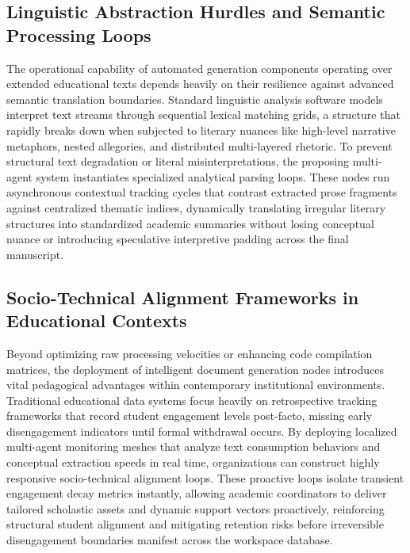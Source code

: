 \subsection{Linguistic Abstraction Hurdles and Semantic Processing Loops}
The operational capability of automated generation components operating over extended educational texts depends heavily on their resilience against advanced semantic translation boundaries. Standard linguistic analysis software models interpret text streams through sequential lexical matching grids, a structure that rapidly breaks down when subjected to literary nuances like high-level narrative metaphors, nested allegories, and distributed multi-layered rhetoric. To prevent structural text degradation or literal misinterpretations, the proposing multi-agent system instantiates specialized analytical parsing loops. These nodes run asynchronous contextual tracking cycles that contrast extracted prose fragments against centralized thematic indices, dynamically translating irregular literary structures into standardized academic summaries without losing conceptual nuance or introducing speculative interpretive padding across the final manuscript.

\subsection{Socio-Technical Alignment Frameworks in Educational Contexts}
Beyond optimizing raw processing velocities or enhancing code compilation matrices, the deployment of intelligent document generation nodes introduces vital pedagogical advantages within contemporary institutional environments. Traditional educational data systems focus heavily on retrospective tracking frameworks that record student engagement levels post-facto, missing early disengagement indicators until formal withdrawal occurs. By deploying localized multi-agent monitoring meshes that analyze text consumption behaviors and conceptual extraction speeds in real time, organizations can construct highly responsive socio-technical alignment loops. These proactive loops isolate transient engagement decay metrics instantly, allowing academic coordinators to deliver tailored scholastic assets and dynamic support vectors proactively, reinforcing structural student alignment and mitigating retention risks before irreversible disengagement boundaries manifest across the workspace database.

